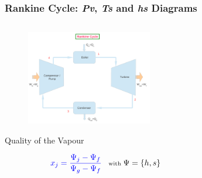 \documentclass[10pt,compress,unknownkeysallowed]{beamer}
\begin{document}
\begin{frame}
 \frametitle{Rankine Cycle: {\it Pv}, {\it Ts} and {\it hs} Diagrams}
 \begin{columns}
%
   \begin{column}[l]{0.45\linewidth}
    \begin{figure}%
     \begin{center}
      \includegraphics[width=5.5cm,clip]{../Pics/Simple_Rankine_Cycle}
     \end{center}
    \end{figure} 
    \begin{block}{\begin{center}Quality of the Vapour\end{center}}
       \begin{displaymath}\scriptsize
         \textcolor{blue}{x_{j} = \displaystyle\frac{\Psi_{j}-\Psi_{f}}{\Psi_{g}-\Psi_{f}}} \;\;\;\text{with }\Psi=\left\{h,s\right\}
       \end{displaymath}
    \end{block}
   \end{column}
%
   \begin{column}[c]{0.55\linewidth}
    \begin{figure}%
     \begin{center}
     \end{center}
    \end{figure}  
   \end{column}
  \end{columns}
\end{frame}
\end{document}
